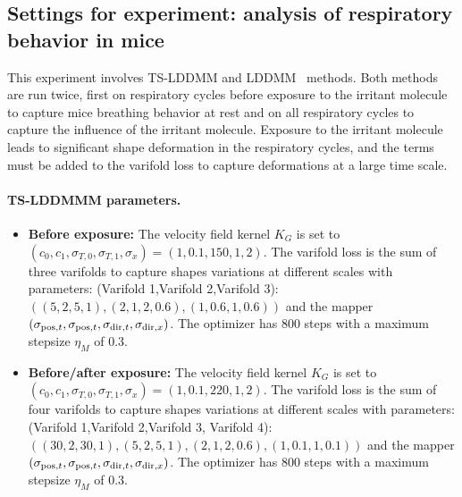 \subsection{Settings for experiment: analysis of respiratory behavior in mice}
\label{appendix: mice_exp_setting}

This experiment involves TS-LDDMM and LDDMM~\cite{glaunes2008large} methods. Both methods are run twice, first on respiratory cycles before exposure to the irritant molecule to capture mice breathing behavior at rest and on all respiratory cycles to capture the influence of the irritant molecule. Exposure to the irritant molecule leads to significant shape deformation in the respiratory cycles, and the terms must be added to the varifold loss to capture deformations at a large time scale. 

\paragraph{TS-LDDMMM parameters.}
\begin{itemize}
  \item \textbf{Before exposure:} The velocity field kernel $K_G$ is set to $ (c_0,c_1,\sigma_{T,0},\sigma_{T,1},\sigma_x) = (1,0.1,150,1,2)$. The varifold loss is the sum of three varifolds to capture shapes variations at different scales with parameters: (Varifold 1,Varifold 2,Varifold 3): $\left((5,2,5,1),(2,1,2,0.6),(1,0.6,1,0.6)\right)$ and the mapper $(\sigma_{\mathrm{pos},t}, \sigma_{\mathrm{pos},t}, \sigma_{\mathrm{dir},t}, \sigma_{\mathrm{dir},x})$. The optimizer has 800 steps with a maximum stepsize $\eta_M$ of 0.3.
  \item \textbf{Before/after exposure:} The velocity field kernel $K_G$ is set to $ (c_0,c_1,\sigma_{T,0},\sigma_{T,1},\sigma_x) = (1,0.1,220,1,2)$. The varifold loss is the sum of four varifolds to capture shapes variations at different scales with parameters: (Varifold 1,Varifold 2,Varifold 3, Varifold 4): $\left((30,2,30,1),(5,2,5,1),(2,1,2,0.6),(1,0.1,1,0.1)\right)$ and the mapper $(\sigma_{\mathrm{pos},t}, \sigma_{\mathrm{pos},t}, \sigma_{\mathrm{dir},t}, \sigma_{\mathrm{dir},x})$. The optimizer has 800 steps with a maximum stepsize $\eta_M$ of 0.3.
\end{itemize}

